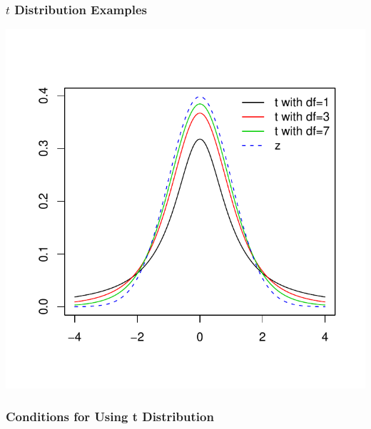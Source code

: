 \documentclass[handout]{beamer}
\newcommand{\blue}[1]{\textcolor{blue2}{#1}}
\begin{document}
\addtocounter{framenumber}{-1}
\begin{frame}
\frametitle{$t$ Distribution Examples}
\begin{center}
\includegraphics{figure/lec16-004}
\end{center}
\end{frame}


\begin{frame}
\frametitle{Conditions for Using t Distribution}
%
	
\end{frame}
\end{document}
